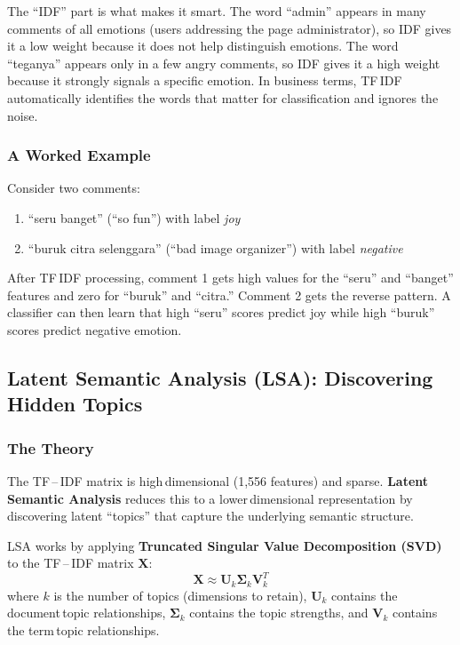\documentclass[12pt,a4paper,twoside]{article}
\theoremstyle{definition}
\begin{document}
The ``IDF'' part is what makes it smart. The word ``admin'' appears in many comments of all emotions (users addressing the page administrator), so IDF gives it a low weight because it does not help distinguish emotions. The word ``teganya'' appears only in a few angry comments, so IDF gives it a high weight because it strongly signals a specific emotion. In business terms, TF\,IDF automatically identifies the words that matter for classification and ignores the noise.
 
\subsubsection{A Worked Example}
 
Consider two comments:
\begin{enumerate}[leftmargin=2em]
    \item ``seru banget'' (``so fun'') with label \textit{joy}
    \item ``buruk citra selenggara'' (``bad image organizer'') with label \textit{negative}
\end{enumerate}
 
After TF\,IDF processing, comment 1 gets high values for the ``seru'' and ``banget'' features and zero for ``buruk'' and ``citra.'' Comment 2 gets the reverse pattern. A classifier can then learn that high ``seru'' scores predict joy while high ``buruk'' scores predict negative emotion.


\subsection{Latent Semantic Analysis (LSA): Discovering Hidden Topics}

\subsubsection{The Theory}

The TF\,--\,IDF matrix is high\,dimensional (1{,}556 features) and sparse. \textbf{Latent Semantic Analysis} \citep{deerwester1990indexing} reduces this to a lower\,dimensional representation by discovering latent ``topics'' that capture the underlying semantic structure.

LSA works by applying \textbf{Truncated Singular Value Decomposition (SVD)} to the TF\,--\,IDF matrix $\mathbf{X}$:
\begin{equation}
\mathbf{X} \approx \mathbf{U}_k \boldsymbol{\Sigma}_k \mathbf{V}_k^T
\end{equation}
where $k$ is the number of topics (dimensions to retain), $\mathbf{U}_k$ contains the document\,topic relationships, $\boldsymbol{\Sigma}_k$ contains the topic strengths, and $\mathbf{V}_k$ contains the term\,topic relationships.
\end{document}
